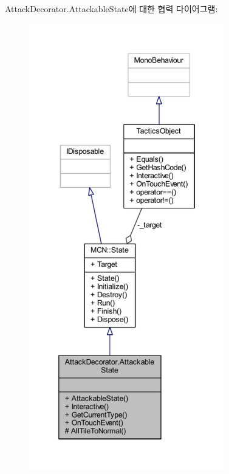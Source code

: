 Attack\+Decorator.\+Attackable\+State에 대한 협력 다이어그램\+:
\nopagebreak
\begin{figure}[H]
\begin{center}
\leavevmode
\includegraphics[height=550pt]{class_attack_decorator_1_1_attackable_state__coll__graph}
\end{center}
\end{figure}
